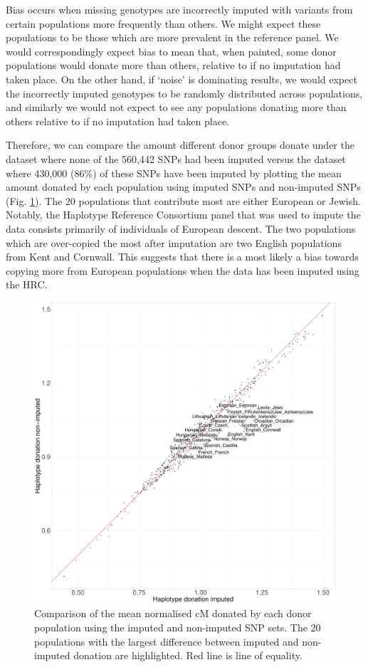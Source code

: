 Bias occurs when missing genotypes are incorrectly imputed with variants from certain populations more frequently than others. We might expect these populations to be those which are more prevalent in the reference panel. We would correspondingly expect bias to mean that, when painted, some donor populations would donate more than others, relative to if no imputation had taken place. On the other hand, if `noise' is dominating results, we would expect the incorrectly imputed genotypes to be randomly distributed across populations, and similarly we would not expect to see any populations donating more than others relative to if no imputation had taken place. 

Therefore, we can compare the amount different donor groups donate under the dataset where none of the 560,442 SNPs had been imputed versus the dataset where 430,000 (86\%) of these SNPs have been imputed by plotting the mean amount donated by each population using imputed SNPs and non-imputed SNPs (Fig. \ref{fig:imputed_nonimputed_donation}). The 20 populations that contribute most are either European or Jewish. Notably, the Haplotype Reference Consortium panel that was used to impute the data consists primarily of individuals of European descent. The two populations which are over-copied the most after imputation are two English populations from Kent and Cornwall. This suggests that there is a most likely a bias towards copying more from European populations when the data has been imputed using the HRC. 

\begin{figure}[htp]
    \centering
    \includegraphics[width=1.0\textwidth]{../images/chapter1/donation_imputed_nonimputed.pdf}
    \caption{Comparison of the mean normalised cM donated by each donor population using the imputed and non-imputed SNP sets. The 20 populations with the largest difference between imputed and non-imputed donation are highlighted. Red line is line of equality.}
    \label{fig:imputed_nonimputed_donation}
\end{figure}

